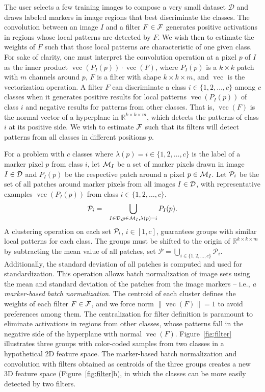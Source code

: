 \documentclass[a4paper,conference]{IEEEtran}
\DeclareMathOperator{\vect}{vec}
\newcommand{\R}{\mathbb{R}}
\newcommand{\D}{\mathcal{D}}
\begin{document}
The user selects a few training images to compose a very small dataset $\D$ and draws labeled markers in image regions that best discriminate the classes. The convolution between an image $I$ and a filter $F\in {\cal F}$ generates positive activations in regions whose local patterns are detected by $F$. We wish then to estimate the weights of $F$ such that those local patterns are characteristic of one given class. For sake of clarity, one must interpret the convolution operation at a pixel $p$ of $I$ as the inner product $\vect(P_I(p)) \cdot \vect(F)$, where $P_I(p)$ is a $k\times k$ patch with $m$ channels around $p$, $F$ is a filter with shape $k\times k \times m$, and $\vect$ is the vectorization operation. A filter $F$ can discriminate a class $i \in \{1,2,\ldots,c\}$ among $c$ classes when it generates positive results for local patterns $\vect(P_I(p))$ of class $i$ and negative results for patterns from other classes. That is, $\vect(F)$ is the normal vector of a hyperplane in $\R^{k\times k\times m}$, which detects the patterns of class $i$ at its positive side. We wish to estimate ${\cal F}$ such that its filters will detect patterns from all classes in different positions $p$. 

For a problem with $c$ classes where $\lambda(p)=i\in \{1,2,\ldots,c\}$ is the label of a marker pixel $p$ from class $i$, let ${\cal M}_I$ be a set of marker pixels drawn in image $I\in {\cal D}$ and $P_I(p)$ be the respective patch around a pixel $p\in {\cal M}_I$. Let ${\cal P}_i$ be the set of all patches around marker pixels from all images $I\in {\cal D}$, with representative examples  $\vect(P_I(p))$ from class $i\in \{1,2,\ldots,c\}$. 
\begin{eqnarray}
{\cal P}_i & = & \bigcup_{I\in {\cal D},p\in {\cal M}_I, \lambda(p) = i}{P_I(p)}.
\label{eq:pset}
\end{eqnarray}
A clustering operation on each set ${\cal P}_i$, $i\in [1,c]$, guarantees groups with similar local patterns for each class. The groups must be shifted to the origin of $\R^{k\times k\times m}$ by subtracting the mean value of all patches, set $\mathcal{P} = \bigcup_{i \in \{1, 2, \ldots, c\}}{\mathcal{P}_i}$. Additionally, the standard deviation of all patches is computed and used for standardization. This operation allows batch normalization of image sets using the mean and standard deviation of the patches from the image markers -- i.e.,  \emph{a marker-based batch normalization}. The centroid of each cluster defines the weights of each filter $F\in {\cal F}$, and we force norm $\|\vect(F)\|=1$ to avoid preferences among them. The centralization for filter definition is paramount to eliminate activations in regions from other classes, whose patterns fall in the negative side of the hyperplane with normal $\vect(F)$. Figure~\ref{fig:filter} illustrates three groups with color-coded samples from two classes in a hypothetical 2D feature space. The marker-based batch normalization and convolution with filters obtained as centroids of the three groups creates a new 3D feature space (Figure~\ref{fig:filter}b), in which the classes can be more easily detected by two filters.
\end{document}

